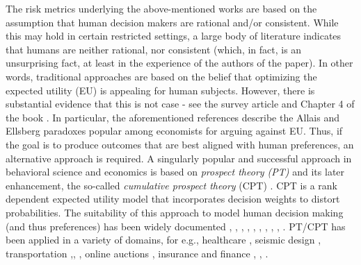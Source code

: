 \documentclass[11pt,letterpaper,english]{article}
\begin{document}
The risk metrics underlying the above-mentioned works 
are based on the assumption that human decision makers are rational and/or consistent.
While this may hold in certain restricted settings, a large body of literature indicates that humans are neither rational,
nor consistent (which, in fact, is an unsurprising fact, at least in the experience of the authors of the paper).
In other words, traditional approaches are based on the belief that optimizing the expected utility (EU) is appealing for human subjects. However, there is substantial evidence that this is not case - see 
the survey article \cite{starmer2000developments} and Chapter 4 of the book \cite{quiggin2012generalized}. In particular, the aforementioned references describe the Allais and Ellsberg paradoxes popular among economists for arguing against EU. 
Thus, if the goal is to produce outcomes that are best aligned with human preferences,
an alternative approach is required.
A singularly popular and successful approach in behavioral science and economics
is based on \textit{prospect theory (PT)} \cite{kahneman1979prospect} 
and its later enhancement, the so-called \textit{cumulative prospect theory} (CPT) \cite{tversky1992advances}.
CPT is a rank dependent expected utility model \cite{quiggin2012generalized} that incorporates decision weights to distort probabilities. 
The suitability of this approach to model human decision making (and thus preferences) has been widely documented \cite{prelec1998probability}, \cite{wu1996curvature}, \cite{conlisk1989three}, \cite{camerer1989experimental}, \cite{camerer1992recent}, \cite{harless1992predictions}, \cite{sopher1993test}, \cite{camerer1994violations}, \cite{gonzalez1999shape}, \cite{abdellaoui2000parameter}.
PT/CPT has been applied in a variety of domains, for e.g., healthcare \cite{lenert1999associations},  seismic design \cite{goda2008application}, transportation \cite{gao2010adaptive},\cite{fujii2004drivers}, \cite{ramming2001network}, online auctions \cite{weinberg2005exploring}, insurance  \cite{machina1995non} and finance \cite{barberis1999prospect}, \cite{epstein1989substitution}, \cite{epstein1991substitution}.
\end{document}
